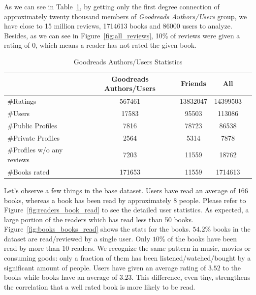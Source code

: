 \documentclass[11pt]{article}
\begin{document}
As we can see in Table~\ref{table:crawl_stat}, by getting only the first degree connection of approximately twenty thousand members of {\it Goodreads Authors/Users} group, we have close to 15 million reviews, 1714613 books and 86000 users to analyze. Besides, as we can see in Figure~\ref{fig:all_reviews}, 10\% of reviews were given a rating of 0, which means a reader has not rated the given book.


\begin{table}[ht]
\begin{center}
\begin{tabular}{lcccc}
\hline
                           &  Goodreads Authors/Users    &   Friends                &   All        \\ \hline
\#Ratings                  &  567461                     &   13832047               &   14399503  \\ \hline
\#Users                    &  17583                      &   95503                  &   113086     \\ \hline
\#Public Profiles          &  7816                       &   78723                  &   86538     \\ \hline
\#Private Profiles         &  2564                       &   5314                   &   7878      \\ \hline
\#Profiles w/o any reviews &  7203                       &   11559                  &   18762      \\ \hline
\#Books rated              &  171653                     &   11559                  &   1714613      \\ \hline
\end{tabular}
\end{center}
\caption{Goodreads Authors/Users Statistics}
\label{table:crawl_stat}
\end{table}

Let's observe a few things in the base dataset.
Users have read an average of $166$ books, whereas a book has been read by approximately $8$ people.
Please refer to Figure~\ref{fig:readers_book_read} to see the detailed user statistics.
As expected, a large portion of the readers which has read less than 50 books.
Figure~\ref{fig:books_books_read} shows the stats for the books.
$54.2\%$ books in the dataset are read/reviewed by a single user.
Only $10$\% of the books have been read by more than $10$ readers.
We recognize the same pattern in music, movies or consuming goods: only a fraction of them has been listened/watched/bought by a significant amount of people.
Users have given an average rating of $3.52$ to the books while books have an average of $3.23$.
This difference, even tiny, strengthens the correlation that a well rated book is more likely to be read.
\end{document}
